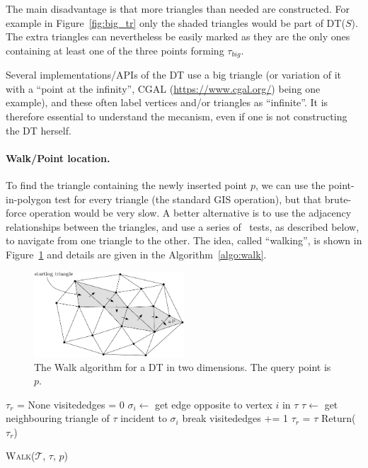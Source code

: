 The main disadvantage is that more triangles than needed are constructed. 
For example in Figure~\ref{fig:big_tr} only the shaded triangles would be part of DT($S$). 
The extra triangles can nevertheless be easily marked as they are the only ones containing at least one of the three points forming $\tau_{big}$. 

\begin{practice-box}
Several implementations/APIs of the DT use a big triangle (or variation of it with a ``point at the infinity'',  CGAL (\url{https://www.cgal.org/}) being one example), and these often label vertices and/or triangles as ``infinite''.
It is therefore essential to understand the mecanism, even if one is not constructing the DT herself.
\end{practice-box}


\paragraph{Walk/Point location.} To find the triangle containing the newly inserted point $p$, we can use the point-in-polygon test for every triangle (the standard GIS operation), but that brute-force operation would be very slow. 
A better alternative is to use the adjacency relationships between the triangles, and use a series of \Orient\ tests, as described below, to navigate from one triangle to the other. 
The idea, called ``walking'', is shown in Figure~\ref{fig:walk} and details are given in the Algorithm~\ref{algo:walk}.
\begin{figure}
  \centering
  \includegraphics[width=0.5\textwidth]{figs/walk}
  \caption{The Walk algorithm for a DT in two dimensions. The query point is $p$.}
\label{fig:walk}
\end{figure}
\begin{algorithm}[t]
  \DontPrintSemicolon
  \BlankLine  
  $\tau_r$ = None\;
  {
    visitededges = 0\;
    {
      $\sigma_i \leftarrow$ get edge opposite to vertex $i$ in $\tau$\;
      {
        $\tau \leftarrow$ get neighbouring triangle of $\tau$ incident to $\sigma_i$\;
        break\;
      }
      visitededges += 1\;
    }  
    {
      $\tau_r$ = $\tau$\;
    }
  }
  Return($\tau_r$)
  \caption{W\textsc{alk}($\mathcal{T}$, $\tau$, $p$)}
\label{algo:walk}
\end{algorithm}
